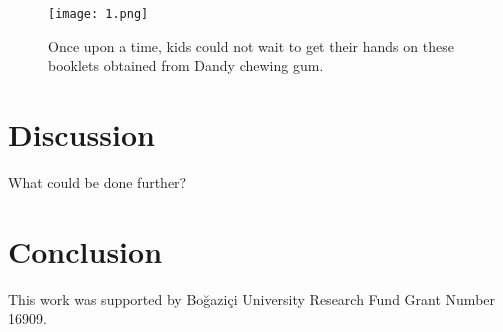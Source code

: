 \documentclass[
]{ceurart}
\begin{document}
\begin{figure}[tbh]
\centering
\texttt{[image: 1.png]}
\caption{Once upon a time, kids could not wait to get their hands on these booklets obtained from Dandy chewing gum.}
\label{fig:demo-fig}
\end{figure}

\section{Discussion}
\label{sec:discussion}

What could be done further?

\section{Conclusion}
\label{sec:conclusion}

\begin{acknowledgments}
This work was supported by Boğaziçi University Research Fund Grant Number 16909.
\end{acknowledgments}


\end{document}
